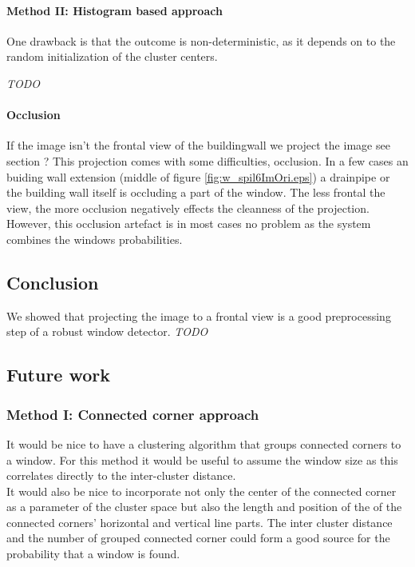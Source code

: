 \paragraph{Method II: Histogram based approach} 
One drawback is that the outcome is non-deterministic, as it depends on to the
random initialization of the cluster centers.

\emph{TODO}\\

\paragraph{Occlusion}
\label{lab:occlusion}
If the image isn't the frontal view of the buildingwall we project the image 
see section ?%
This projection comes with some difficulties, occlusion.  In a few cases an
buiding wall extension (middle of figure \ref{fig:w_spil6ImOri.eps}) a drainpipe
or the building wall itself is occluding a part of the window.  The less frontal
the view, the more occlusion negatively effects the cleanness of the projection.
However, this occlusion artefact is in most cases no problem as the system
combines the windows probabilities.  

\subsection{Conclusion}
We showed that projecting the image to a frontal view is a good preprocessing
step of a robust window detector.
\emph{TODO}

\subsection{Future work}
\subsubsection{Method I: Connected corner approach} 
It would be nice to have a clustering algorithm that groups connected corners to
a window. For this method it would be useful to assume the window size as this
correlates directly to the inter-cluster distance.\\

It would also be nice to incorporate not only the center of the connected corner
as a parameter of the cluster space but also the length and position of the of
the connected corners' horizontal and vertical line parts.  The inter cluster
distance and the number of grouped connected corner could form a good source for
the probability that a window is found.

